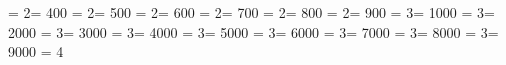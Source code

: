 {  \else
  \armnu@setchb{\Armnu}\ifx\armnu@cha\armnu@chb
  \armnu@cta = 2\armnu@ctb = 400
  \else
  \armnu@setchb{\Armsha}\ifx\armnu@cha\armnu@chb
  \armnu@cta = 2\armnu@ctb = 500
  \else
  \armnu@setchb{\Armvo}\ifx\armnu@cha\armnu@chb
  \armnu@cta = 2\armnu@ctb = 600
  \else
  \armnu@setchb{\Armcha}\ifx\armnu@cha\armnu@chb
  \armnu@cta = 2\armnu@ctb = 700
  \else
  \armnu@setchb{\Armpe}\ifx\armnu@cha\armnu@chb
  \armnu@cta = 2\armnu@ctb = 800
  \else
  \armnu@setchb{\Armje}\ifx\armnu@cha\armnu@chb
  \armnu@cta = 2\armnu@ctb = 900
  \else
  \armnu@setchb{\Armra}\ifx\armnu@cha\armnu@chb
  \armnu@cta = 3\armnu@ctb = 1000
  \else
  \armnu@setchb{\Armse}\ifx\armnu@cha\armnu@chb
  \armnu@cta = 3\armnu@ctb = 2000
  \else
  \armnu@setchb{\Armvev}\ifx\armnu@cha\armnu@chb
  \armnu@cta = 3\armnu@ctb = 3000
  \else
  \armnu@setchb{\Armtyun}\ifx\armnu@cha\armnu@chb
  \armnu@cta = 3\armnu@ctb = 4000
  \else
  \armnu@setchb{\Armre}\ifx\armnu@cha\armnu@chb
  \armnu@cta = 3\armnu@ctb = 5000
  \else
  \armnu@setchb{\Armtso}\ifx\armnu@cha\armnu@chb
  \armnu@cta = 3\armnu@ctb = 6000
  \else
  \armnu@setchb{\Armvyun}\ifx\armnu@cha\armnu@chb
  \armnu@cta = 3\armnu@ctb = 7000
  \else
  \armnu@setchb{\Armpyur}\ifx\armnu@cha\armnu@chb
  \armnu@cta = 3\armnu@ctb = 8000
  \else
  \armnu@setchb{\Armke}\ifx\armnu@cha\armnu@chb
  \armnu@cta = 3\armnu@ctb = 9000
  \else
  \armnu@cta = 4
  \fi\fi\fi\fi\fi\fi\fi\fi\fi
  \fi\fi\fi\fi\fi\fi\fi\fi\fi
  \fi\fi\fi\fi\fi\fi\fi\fi\fi
  \fi\fi\fi\fi\fi\fi\fi\fi\fi
}%
%
\def\unarmnumeral@aux{\afterassignment\unarmnumeral@loop\armnu@gobcha}%
%
\def\unarmnumeral@loop{%
  \ifx\armnu@cha\armnu@nil
    \let\armnu@next=\relax
  \else
    \armnu@chaval
    \ifnum\armnu@cta<\armnu@ctc
      \advance\armnumeralcount by \armnu@ctb
      \armnu@ctc=\armnu@cta
      \let\armnu@next=\unarmnumeral@aux
    \else
      \errmessage{Invalid argument in \string\unarmnumeral}%
      \armnumeralcount=0\relax
      \let\armnu@next=\armnu@skip
    \fi
  \fi
  \armnu@next
}%
%
\def\unarmnumeral@star*#1{\edef\armnu@tmpa{#1}\armnumeralcount = 0
  \armnu@ctc = 4\armnu@cta = 0\armnu@ctb = 0
  \expandafter\unarmnumeral@aux\armnu@tmpa\armnu@nil
}%
%
\def\unarmnumeral@nonstar#1{\unarmnumeral@star*{#1}\the\armnumeralcount}%
%
\let\Arm@optionalstar=*\relax
\def\unarmnumeral@auxbis{%
   \ifx\Arm@nextchar\Arm@optionalstar
     \expandafter\unarmnumeral@star
   \else
     \expandafter\unarmnumeral@nonstar
   \fi
}%
%
\def\unarmnumeral{\futurelet\Arm@nextchar\unarmnumeral@auxbis}%
